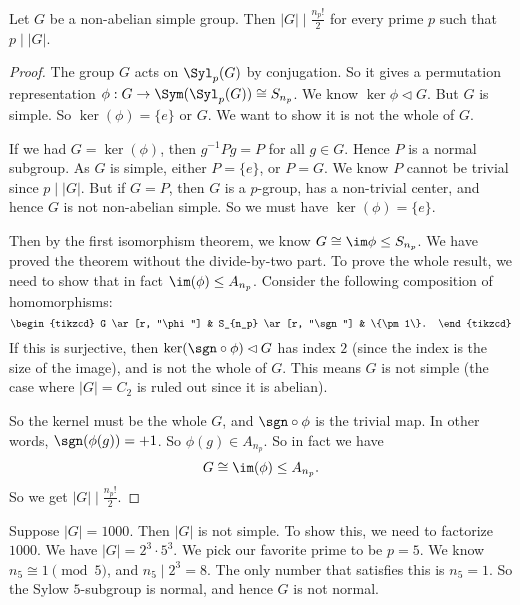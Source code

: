 \documentclass[a4paper]{article}
\begin{document}
\begin{cor}
  Let $G$ be a non-abelian simple group. Then $|G| \mid \frac{n_p!}{2}$ for every prime $p$ such that $p \mid |G|$.
\end{cor}

\begin{proof}
  The group $G$ acts on $\Syl_p(G)$ by conjugation. So it gives a permutation representation $\phi: G \to \Sym(\Syl_p(G)) \cong S_{n_p}$. We know $\ker \phi \lhd G$. But $G$ is simple. So $\ker(\phi)= \{e\}$ or $G$. We want to show it is not the whole of $G$.

  If we had $G = \ker(\phi)$, then $g^{-1} Pg = P$ for all $g \in G$. Hence $P$ is a normal subgroup. As $G$ is simple, either $P = \{e\}$, or $P = G$. We know $P$ cannot be trivial since $p \mid |G|$. But if $G = P$, then $G$ is a $p$-group, has a non-trivial center, and hence $G$ is not non-abelian simple. So we must have $\ker(\phi) = \{e\}$.

  Then by the first isomorphism theorem, we know $G \cong \im \phi \leq S_{n_p}$. We have proved the theorem without the divide-by-two part. To prove the whole result, we need to show that in fact $\im (\phi) \leq A_{n_p}$. Consider the following composition of homomorphisms:
  \[
    \begin{tikzcd}
      G \ar[r, "\phi"] & S_{n_p} \ar[r, "\sgn"] & \{\pm 1\}.
    \end{tikzcd}
  \]
  If this is surjective, then $\ker (\sgn \circ \phi) \lhd G$ has index $2$ (since the index is the size of the image), and is not the whole of $G$. This means $G$ is not simple (the case where $|G| = C_2$ is ruled out since it is abelian).

  So the kernel must be the whole $G$, and $\sgn \circ \phi$ is the trivial map. In other words, $\sgn(\phi(g)) = +1$. So $\phi(g) \in A_{n_p}$. So in fact we have
  \[
    G \cong \im(\phi) \leq A_{n_p}.
  \]
  So we get $|G| \mid \frac{n_p!}{2}$.
\end{proof}

\begin{eg}
  Suppose $|G| = 1000$. Then $|G|$ is not simple. To show this, we need to factorize $1000$. We have $|G| = 2^3 \cdot 5^3$. We pick our favorite prime to be $p = 5$. We know $n_5 \cong 1 \pmod 5$, and $n_5 \mid 2^3 = 8$. The only number that satisfies this is $n_5 = 1$. So the Sylow $5$-subgroup is normal, and hence $G$ is not normal.
\end{eg}
\end{document}
